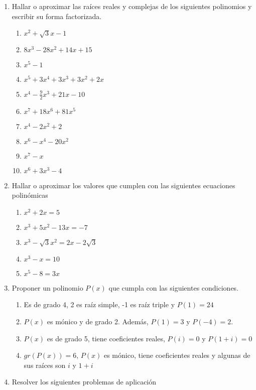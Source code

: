 \documentclass[a4paper]{article}
\newcommand{\exercise}{\item}
\newcommand{\df}[2]{\displaystyle\frac{#1}{#2}}
\begin{document}
\begin{enumerate}
\begin{enumerate} [label=(\alph*)]
		\item $x^3+\alpha x^2+\beta x+5$ es divisible por $Q(x)=x^2+x+1$
	\end{enumerate}
	\exercise Hallar o aproximar las raíces reales y complejas de los siguientes polinomios y escribir su forma factorizada. 
	\begin{multicols}{2}
	\begin{enumerate} [label=(\alph*)]
		\item $x^2+\sqrt{3}x-1$
		\item $8x^3-28x^2+14x+15$
		\item $x^5-1$
		\item $x^5+3x^4+3x^3+3x^2+2x$
		\item $x^4-\df{9}{2}x^3+21x-10$
		\item $x^7+18x^6+81x^5$
		\item $x^4-2x^2+2$
		\item $x^6-x^4-20x^2$
		\item $x^7-x$
		\item $x^6+3x^3-4$
	\end{enumerate}
	\end{multicols}
	\exercise Hallar o aproximar los valores que cumplen con las siguientes ecuaciones polinómicas 
	\begin{multicols}{2}
	\begin{enumerate} [label=(\alph*)]
		\item $x^2+2x=5$
		\item $x^3+5x^2-13x = -7$
		\item $x^3 -\sqrt{3}x^2 = 2x - 2\sqrt{3}$
		\item $x^3-x=10$
		\item $x^5-8=3x$
	\end{enumerate}
	\end{multicols}
	\exercise Proponer un polinomio $P(x)$ que cumpla con las siguientes condiciones.
	\begin{enumerate} [label=(\alph*)]
		\item Es de grado 4, 2 es raíz simple, -1 es raíz triple y $P(1)=24$
		\item $P(x)$ es mónico y de grado 2. Además, $P(1)=3$ y $P(-4)=2$.
		\item $P(x)$ es de grado 5, tiene coeficientes reales, $P(i)=0$ y $P(1+i)=0$
		\item $gr\left(P(x)\right)=6$, $P(x)$ es mónico, tiene coeficientes reales y algunas de sus raíces son $i$ y $1+i$
	\end{enumerate}
	\exercise Resolver los siguientes problemas de aplicación

\end{enumerate}
\end{document}
